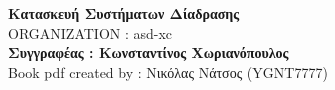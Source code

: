\begin{titlepage}
\centering
\Huge \textbf{Κατασκευή Συστήματων Δίαδρασης} \\
\vspace{1cm}
\LARGE ORGANIZATION : asd-xc \\
\vfill
\Large \textbf{Συγγραφέας : Κωνσταντίνος Χωριανόπουλος} \\
\vspace{0.5cm}
\Large Book pdf created by : Νικόλας Νάτσος (YGNT7777)
\end{titlepage}

